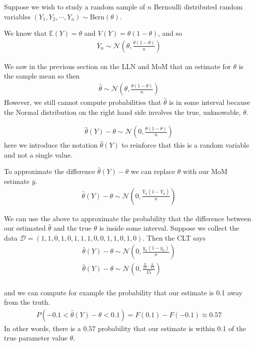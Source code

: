 \begin{VT1}

Suppose we wish to study a random sample of $n$ Bernoulli distributed random variables $(Y_{1},Y_{2},\cdots,Y_{n}) \sim \text{Bern}(\theta)$.

We know that $\mathbb{E}(Y) = \theta$ and $V(Y) = \theta(1-\theta)$, and so 
\begin{align}
    \overline{Y}_{n} \sim \mathcal{N}\left(\theta, \frac{\theta (1-\theta)}{n} \right)
\end{align}

We saw in the previous section on the LLN and MoM that an estimate for $\theta$ is the sample mean so then 
\begin{align}
    \hat{\theta} \sim \mathcal{N}\left(\theta, \frac{\theta (1-\theta)}{n} \right)
\end{align}
However, we still cannot compute probabilities that $\hat{\theta}$ is in some interval because the Normal distribution on the right hand side involves the true, unknowable, $\theta$.

\begin{align}
    \hat{\theta}(Y) - \theta \sim \mathcal{N}\left(0, \frac{\theta (1-\theta)}{n} \right)
\end{align}
here we introduce the notation $\hat{\theta}(Y)$ to reinforce that this is a random variable and not a single value.

To approximate the difference $\hat{\theta}(Y) - \theta$ we can replace $\theta$ with our MoM estimate $\overline{y}$.
\begin{align}
    \hat{\theta}(Y) - \theta \sim \mathcal{N}\left(0, \frac{\overline{Y}_{n} (1-\overline{Y}_{n})}{n} \right)
\end{align}

We can use the above to approximate the probability that the difference between our estimated $\hat{\theta}$ and the true $\theta$ is inside some interval. 
Suppose we collect the data $\mathcal{D} = (1,1,0,1,0,1,1,1,0,0,1,1,0,1,0)$.
Then the CLT says 
\begin{align}
    \hat{\theta}(Y) - \theta \sim \mathcal{N}\left(0, \frac{\overline{y}_{n} (1-\overline{y}_{n})}{n} \right) \\ 
    \hat{\theta}(Y) - \theta \sim \mathcal{N}\left(0, \frac{ \frac{9}{15}  \cdot \frac{6}{15}} {15} \right) \\ 
\end{align}

and we can compute for example the probability that our estimate is 0.1 away from the truth. 
\begin{align}
    P( -0.1 <   \hat{\theta}(Y) - \theta < 0.1) = F(0.1) - F(-0.1) \approx 0.57
\end{align}
In other words, there is a $0.57$ probability that our estimate is within 0.1 of the true parameter value $\theta$.


\end{VT1}



